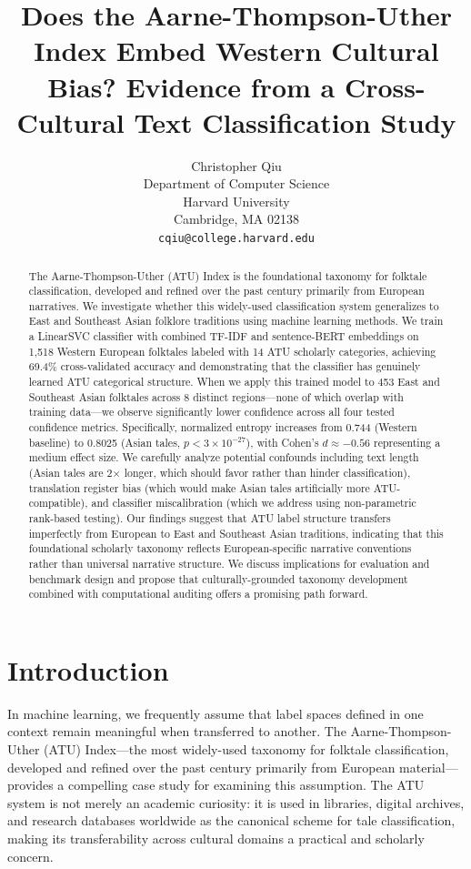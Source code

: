 \documentclass{article}
\title{Does the Aarne-Thompson-Uther Index Embed Western Cultural Bias? Evidence from a Cross-Cultural Text Classification Study}
\author{Christopher Qiu \\
  Department of Computer Science \\
  Harvard University \\
  Cambridge, MA 02138 \\
  \texttt{cqiu@college.harvard.edu} \\
}
\begin{document}
\maketitle

\begin{abstract}
The Aarne-Thompson-Uther (ATU) Index is the foundational taxonomy for folktale classification, developed and refined over the past century primarily from European narratives. We investigate whether this widely-used classification system generalizes to East and Southeast Asian folklore traditions using machine learning methods. We train a LinearSVC classifier with combined TF-IDF and sentence-BERT embeddings on 1,518 Western European folktales labeled with 14 ATU scholarly categories, achieving 69.4\% cross-validated accuracy and demonstrating that the classifier has genuinely learned ATU categorical structure. When we apply this trained model to 453 East and Southeast Asian folktales across 8 distinct regions---none of which overlap with training data---we observe significantly lower confidence across all four tested confidence metrics. Specifically, normalized entropy increases from 0.744 (Western baseline) to 0.8025 (Asian tales, $p < 3 \times 10^{-27}$), with Cohen's $d \approx -0.56$ representing a medium effect size. We carefully analyze potential confounds including text length (Asian tales are 2$\times$ longer, which should favor rather than hinder classification), translation register bias (which would make Asian tales artificially more ATU-compatible), and classifier miscalibration (which we address using non-parametric rank-based testing). Our findings suggest that ATU label structure transfers imperfectly from European to East and Southeast Asian traditions, indicating that this foundational scholarly taxonomy reflects European-specific narrative conventions rather than universal narrative structure. We discuss implications for evaluation and benchmark design and propose that culturally-grounded taxonomy development combined with computational auditing offers a promising path forward.
\end{abstract}

\section{Introduction}

In machine learning, we frequently assume that label spaces defined in one context remain meaningful when transferred to another. The Aarne-Thompson-Uther (ATU) Index---the most widely-used taxonomy for folktale classification, developed and refined over the past century primarily from European material---provides a compelling case study for examining this assumption. The ATU system is not merely an academic curiosity: it is used in libraries, digital archives, and research databases worldwide as the canonical scheme for tale classification, making its transferability across cultural domains a practical and scholarly concern.
\end{document}
